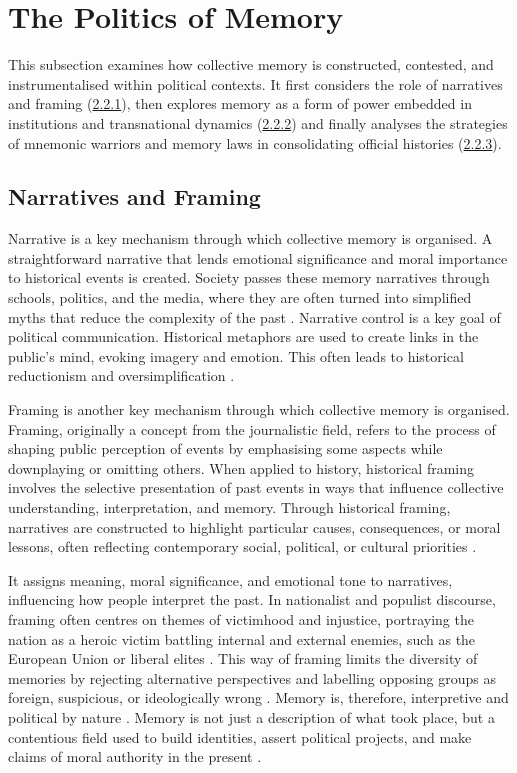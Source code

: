 \section{The Politics of Memory}

This subsection examines how collective memory is constructed, contested, and instrumentalised within political contexts. It first considers the role of narratives and framing (\hyperref[sec:narrative_and_framing]{2.2.1}), then explores memory as a form of power embedded in institutions and transnational dynamics (\hyperref[sec:memory_is_power]{2.2.2}) and finally analyses the strategies of mnemonic warriors and memory laws in consolidating official histories (\hyperref[sec:mnemonic_warriors_and_memory_laws]{2.2.3}).

\subsection{Narratives and Framing}
\label{sec:narrative_and_framing}

Narrative is a key mechanism through which collective memory is organised. A straightforward narrative that lends emotional significance and moral importance to historical events is created. Society passes these memory narratives through schools, politics, and the media, where they are often turned into simplified myths that reduce the complexity of the past \citep{smorti_why_2016}. Narrative control is a key goal of political communication. Historical metaphors are used to create links in the public's mind, evoking imagery and emotion. This often leads to historical reductionism and oversimplification \citep{mumford_parallels_2015}.

Framing is another key mechanism through which collective memory is organised. Framing, originally a concept from the journalistic field, refers to the process of shaping public perception of events by emphasising some aspects while downplaying or omitting others. When applied to history, historical framing involves the selective presentation of past events in ways that influence collective understanding, interpretation, and memory. Through historical framing, narratives are constructed to highlight particular causes, consequences, or moral lessons, often reflecting contemporary social, political, or cultural priorities \citep{entman_framing_1993}.

It assigns meaning, moral significance, and emotional tone to narratives, influencing how people interpret the past. In nationalist and populist discourse, framing often centres on themes of victimhood and injustice, portraying the nation as a heroic victim battling internal and external enemies, such as the European Union or liberal elites \citep{riedel_tri-marium_2022}. This way of framing limits the diversity of memories by rejecting alternative perspectives and labelling opposing groups as foreign, suspicious, or ideologically wrong \citep{piotrowski_between_2010}.
Memory is, therefore, interpretive and political by nature \citep{kucia_europeanization_2016}. Memory is not just a description of what took place, but a contentious field used to build identities, assert political projects, and make claims of moral authority in the present \citep{brown_making_1998}.

